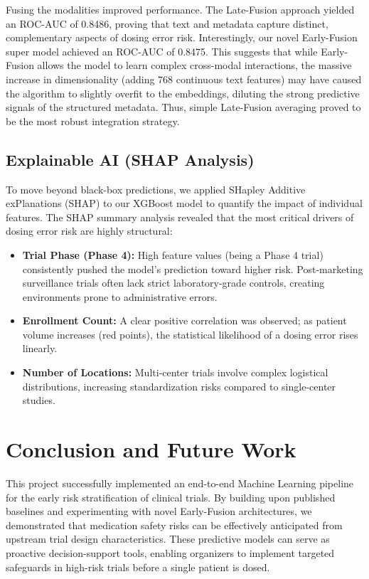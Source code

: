 \documentclass[11pt,a4paper]{article}
\begin{document}
Fusing the modalities improved performance. The Late-Fusion approach yielded an ROC-AUC of 0.8486, proving that text and metadata capture distinct, complementary aspects of dosing error risk. Interestingly, our novel Early-Fusion super model achieved an ROC-AUC of 0.8475. This suggests that while Early-Fusion allows the model to learn complex cross-modal interactions, the massive increase in dimensionality (adding 768 continuous text features) may have caused the algorithm to slightly overfit to the embeddings, diluting the strong predictive signals of the structured metadata. Thus, simple Late-Fusion averaging proved to be the most robust integration strategy.

\subsection{Explainable AI (SHAP Analysis)}
To move beyond black-box predictions, we applied SHapley Additive exPlanations (SHAP) to our XGBoost model to quantify the impact of individual features. The SHAP summary analysis revealed that the most critical drivers of dosing error risk are highly structural:
\begin{itemize}
    \item \textbf{Trial Phase (Phase 4):} High feature values (being a Phase 4 trial) consistently pushed the model's prediction toward higher risk. Post-marketing surveillance trials often lack strict laboratory-grade controls, creating environments prone to administrative errors.
    \item \textbf{Enrollment Count:} A clear positive correlation was observed; as patient volume increases (red points), the statistical likelihood of a dosing error rises linearly.
    \item \textbf{Number of Locations:} Multi-center trials involve complex logistical distributions, increasing standardization risks compared to single-center studies.
\end{itemize}

\section{Conclusion and Future Work}
This project successfully implemented an end-to-end Machine Learning pipeline for the early risk stratification of clinical trials. By building upon published baselines and experimenting with novel Early-Fusion architectures, we demonstrated that medication safety risks can be effectively anticipated from upstream trial design characteristics. These predictive models can serve as proactive decision-support tools, enabling organizers to implement targeted safeguards in high-risk trials before a single patient is dosed.
\end{document}
